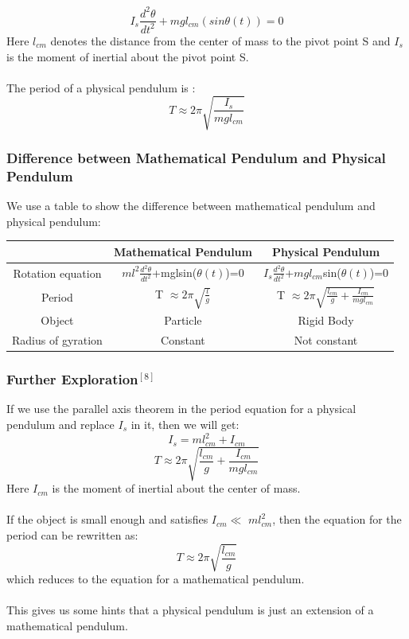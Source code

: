 \documentclass[12pt,a4paper]{article}
\begin{document}
$$I_s\frac{d^2\theta}{dt^2}+mgl_{cm}(sin\theta(t))=0$$
Here $l_{cm}$ denotes the distance from the center of mass to the pivot point S and $I_s$ is the moment of inertial about the pivot point S.\\
~\\
The period of a physical pendulum is :
$$T\approx 2\pi\sqrt{\frac{I_s}{mgl_{cm}}}$$
\subsubsection{Difference between Mathematical Pendulum and Physical Pendulum}
We use a table to show the difference between mathematical pendulum and physical pendulum:
\begin{table}[h!]
\centering
\begin{tabular}{|c|c|c|}
\hline
~&Mathematical Pendulum&Physical Pendulum\\
\hline
Rotation equation&$ml^2\frac{d^2\theta}{dt^2} $+mglsin($\theta(t)$)=0&$I_s\frac{d^2\theta}{dt^2} $+$mgl_{cm}$sin($\theta(t)$)=0\\
\hline
Period&T $\approx 2\pi \sqrt{\frac{l}{g}}$&T $\approx 2\pi \sqrt{\frac{l_{cm}}{g}+\frac{I_{cm}}{mgl_{cm}}}$\\
\hline
Object&Particle&Rigid Body\\
\hline
Radius of gyration&Constant&Not constant\\
\hline
\end{tabular}
\end{table}
\subsubsection{Further Exploration$^{[8]}$}
If we use the parallel axis theorem in the period equation for a physical pendulum and replace $I_s$ in it, then we will get:
$$I_s=ml_{cm}^2+I_{cm}$$
$$T \approx 2\pi \sqrt{\frac{l_{cm}}{g}+\frac{I_{cm}}{mgl_{cm}}}$$
Here $I_{cm}$ is the moment of inertial about the center of mass.\\
~\\
If the object is small enough and satisfies $I_{cm} \ll$ $ml_{cm}^2$, then the equation for the period can be rewritten as:
$$T \approx 2\pi \sqrt{\frac{l_{cm}}{g}}$$
which reduces to the equation for a mathematical pendulum.\\
~\\
This gives us some hints that a physical pendulum is just an extension of a mathematical pendulum.\\
\end{document}
